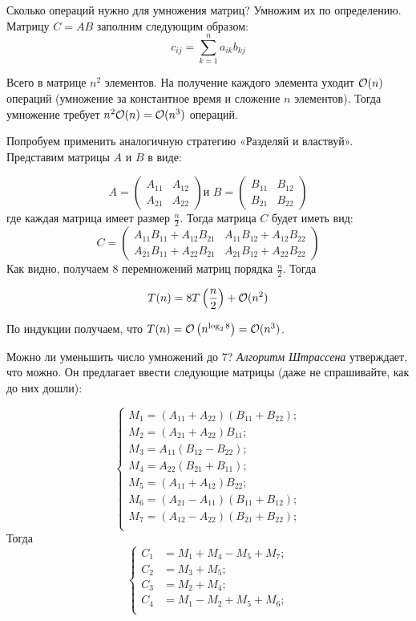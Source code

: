 \documentclass[a4paper, 12pt]{article}
\begin{document}
Сколько операций нужно для умножения матриц? Умножим их по определению. Матрицу
$C = AB$ заполним следующим образом:
\[c_{ij} = \sum\limits_{k = 1}^{n} a_{ik}b_{kj}\]

Всего в матрице $n^2$ элементов. На получение каждого элемента уходит $\mathcal{O}(n)$ 
операций (умножение за константное время и сложение $n$ элементов). Тогда 
умножение требует $n^2\mathcal{O}(n) = \mathcal{O}(n^3)$
операций.

Попробуем применить аналогичную стратегию «Разделяй и властвуй». Представим
матрицы $A$ и $B$ в виде:

\[A = \begin{pmatrix}
A_{11} & A_{12}\\
A_{21} & A_{22}
\end{pmatrix}
\text{и } 
B = \begin{pmatrix}
B_{11} & B_{12}\\
B_{21} & B_{22}
\end{pmatrix}\]
где каждая матрица имеет размер $\frac{n}{2}$. Тогда матрица $C$ будет иметь вид:
\[C = \begin{pmatrix}
A_{11}B_{11}+A_{12}B_{21} & A_{11}B_{12}+A_{12}B_{22}\\
A_{21}B_{11}+A_{22}B_{21} & A_{21}B_{12}+A_{22}B_{22}
\end{pmatrix}\]
 Как видно, получаем 8 перемножений матриц порядка $\frac{n}{2}$. Тогда

\[T(n) = 8T\left( \frac{n}{2} \right) + \mathcal{O}(n^2)\]

По индукции получаем, что $T(n) = \mathcal{O}\left(n^{\log_{2} 8}\right) = \mathcal{O}(n^{3})$.

Можно ли уменьшить число умножений до 7? \emph{Алгоритм Штрассена} утверждает,
что можно. Он предлагает ввести следующие матрицы (даже не спрашивайте, как до них дошли):

\[\begin{cases}
    M_1 = (A_{11} + A_{22})(B_{11} + B_{22}); \\
    M_2 = (A_{21} + A_{22})B_{11}; \\
    M_3 = A_{11}(B_{12} - B_{22}); \\
    M_4 = A_{22}(B_{21} + B_{11}); \\
    M_5 = (A_{11} + A_{12})B_{22}; \\
    M_6 = (A_{21} - A_{11})(B_{11} + B_{12}); \\
    M_7 = (A_{12} - A_{22})(B_{21} + B_{22}); \\
\end{cases}\]
Тогда
\[\begin{cases}
    C_1 &= M_1+M_4-M_5+M_7; \\
    C_2 &= M_3+M_5; \\
    C_3 &= M_2+M_4; \\
    C_4 &= M_1-M_2+M_5+M_6; \\
\end{cases}\]
\end{document}
